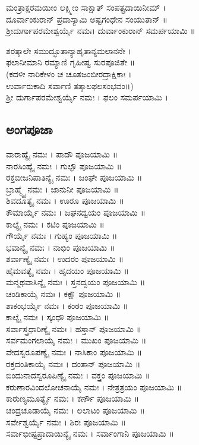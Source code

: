 ಮಂತ್ರಾಕ್ಷರಮಯೀಂ ಲಕ್ಷ್ಮೀಂ ಸಾಕ್ಷಾತ್ ಸಂಪತ್ಪ್ರದಾಯಿನೀಮ್ ।\\
ದೂರ್ವಾಂಕುರಾನ್  ಪ್ರದಾಸ್ಯಾಮಿ ಅಷ್ಟಗಂಧೇನ ಸಂಯುತಾನ್ ॥\\
ಶ್ರೀದುರ್ಗಾಪರಮೇಶ್ವರ್ಯೈ ನಮಃ। ದುರ್ವಾಂಕುರಾನ್ ಸಮರ್ಪಯಾಮಿ ॥

ಶರತ್ಕಾಲೇ ಸಮುದ್ಭೂತಾನ್ಯಾಹೃತಾನ್ಯಮಲಾನನೇ ।\\
ಫಲಾನೀಮಾನಿ ರಮ್ಯಾಣಿ ಗೃಹೀಷ್ವ ಸುರಪೂಜಿತೇ ॥\\
(ಕದಳೀ ನಾರಿಕೇಳಂ ಚ ಚೂತಜಂಬೀರದ್ರಾಕ್ಷಿಕಾಃ ।\\
ಉರ್ವಾರುಕಾದಿ ಸರ್ವಾಣಿ ತತ್ಕಾಲಫಲಸಂಭವಂ॥)\\
ಶ್ರೀ ದುರ್ಗಾಪರಮೇಶ್ವರ್ಯೈ ನಮಃ । ಫಲಂ ಸಮರ್ಪಯಾಮಿ ।

\subsection{ಅಂಗಪೂಜಾ}
ವಾರಾಹ್ಯೈ ನಮಃ । ಪಾದೌ  ಪೂಜಯಾಮಿ ॥\\
ನಾರಸಿಂಹ್ಯೈ ನಮಃ । ಗುಲ್ಫೌ  ಪೂಜಯಾಮಿ ॥\\
ರಕ್ತಬೀಜನಿಪಾತಿನ್ಯೈ ನಮಃ । ಜಂಘೇ  ಪೂಜಯಾಮಿ ॥\\
ಬ್ರಾಹ್ಮ್ಯೈ ನಮಃ । ಜಾನುನೀ  ಪೂಜಯಾಮಿ ॥\\
ಶಿವದೂತ್ಯೈ ನಮಃ । ಊರೂ  ಪೂಜಯಾಮಿ ॥\\
ಕೌಮಾರ್ಯೈ ನಮಃ । ಜಘನದ್ವಯಂ  ಪೂಜಯಾಮಿ ॥\\
ಕಾಲ್ಯೈ ನಮಃ । ಕಟಿಂ  ಪೂಜಯಾಮಿ ॥\\
ಗೌರ್ಯೈ ನಮಃ । ಗುಹ್ಯಂ  ಪೂಜಯಾಮಿ ॥\\
ಭವಾನ್ಯೈ ನಮಃ । ನಾಭಿಂ  ಪೂಜಯಾಮಿ ॥\\
ಶರ್ವಾಣ್ಯೈ ನಮಃ । ಉದರಂ  ಪೂಜಯಾಮಿ ॥\\
ಹೈಮವತ್ಯೈ ನಮಃ । ಹೃದಯಂ  ಪೂಜಯಾಮಿ ॥\\
ಮನ್ಮಥವಾಸಿನ್ಯೈ ನಮಃ । ಸ್ತನದ್ವಯಂ  ಪೂಜಯಾಮಿ ॥\\
ಚಂಡಿಕಾಯೈ ನಮಃ । ಕಕ್ಷೌ  ಪೂಜಯಾಮಿ ॥\\
ಶಾಕಂಭರ್ಯೈ ನಮಃ । ಕಂಠಂ  ಪೂಜಯಾಮಿ ॥\\
ಕಾಲ್ಯೈ ನಮಃ । ಸ್ಕಂಧೌ  ಪೂಜಯಾಮಿ ॥\\
ಸರ್ವಾಸ್ತ್ರಧಾರಿಣ್ಯೈ ನಮಃ । ಹಸ್ತಾನ್  ಪೂಜಯಾಮಿ ॥\\
ಸರ್ವಮಂಗಲಾಯೈ ನಮಃ । ಮುಖಂ  ಪೂಜಯಾಮಿ ॥\\
ವೇದಸ್ವರೂಪಣ್ಯೈ ನಮಃ । ನಾಸಿಕಾಂ  ಪೂಜಯಾಮಿ ॥\\
ರಕ್ತದಂತಿಕಾಯೈ ನಮಃ । ದಂತಾನ್  ಪೂಜಯಾಮಿ ॥\\
ಬಿಂದುನಾದಸ್ವರೂಪಿಣ್ಯೈ ನಮಃ । ವಕ್ತ್ರಂ  ಪೂಜಯಾಮಿ ॥\\
ಕರುಣಾರವಿಂದಲೋಚನಾಯೈ ನಮಃ । ನೇತ್ರತ್ರಯಂ  ಪೂಜಯಾಮಿ ॥\\
ಕಾರುಣ್ಯಮೂರ್ತ್ಯೈ ನಮಃ । ಕರ್ಣೌ  ಪೂಜಯಾಮಿ ॥\\
ಚಂದ್ರಚೂಡಾಯೈ ನಮಃ । ಲಲಾಟಂ  ಪೂಜಯಾಮಿ ॥\\
ಸರ್ವೇಶ್ವರ್ಯೈ ನಮಃ । ಶಿರಃ  ಪೂಜಯಾಮಿ ॥\\
ಸರ್ವಾಭೀಷ್ಟಪ್ರಾದಾಯಿನ್ಯೈ ನಮಃ । ಸರ್ವಾಂಗಾನಿ ಪೂಜಯಾಮಿ ॥
